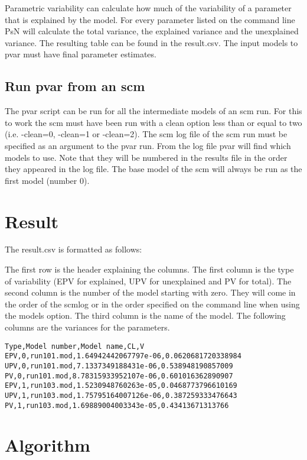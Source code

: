 Parametric variability can calculate how much of the variability of a parameter that is explained by the model. For every parameter listed on the command line PsN will calculate the total variance, the explained variance and the unexplained variance. The resulting table can be found in the result.csv. The input models to pvar must have final parameter estimates.

\subsection{Run pvar from an scm}
The pvar script can be run for all the intermediate models of an scm run. For this to work the scm must have been run with a clean option less than or equal to two (i.e. -clean=0, -clean=1 or -clean=2). The scm log file of the scm run must be specified as an argument to the pvar run. From the log file pvar will find which models to use. Note that they will be numbered in the results file in the order they appeared in the log file. The base model of the scm will always be run as the first model (number 0). 

\section{Result}

The result.csv is formatted as follows:

The first row is the header explaining the columns.
The first column is the type of variability (EPV for explained, UPV for unexplained and PV for total). The second column is the number of the model starting with zero. They will come in the order of the scmlog or in the order specified on the command line when using the models option. The third column is the name of the model. The following columns are the variances for the parameters.

\begin{verbatim}
Type,Model number,Model name,CL,V
EPV,0,run101.mod,1.64942442067797e-06,0.0620681720338984
UPV,0,run101.mod,7.1337349188431e-06,0.538948190857009
PV,0,run101.mod,8.78315933952107e-06,0.601016362890907
EPV,1,run103.mod,1.5230948760263e-05,0.0468773796610169
UPV,1,run103.mod,1.75795164007126e-06,0.387259333476643
PV,1,run103.mod,1.69889004003343e-05,0.43413671313766
\end{verbatim}

\section{Algorithm}

